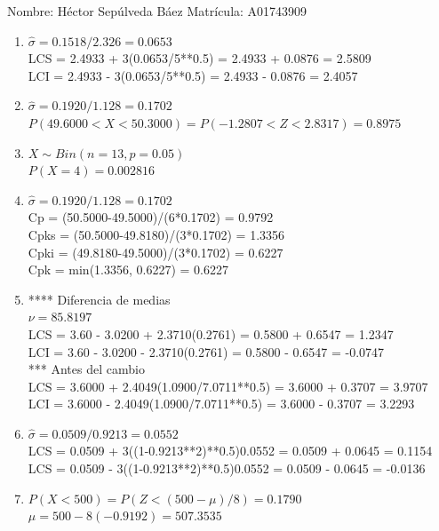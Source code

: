 \documentclass[8pt]{report}
\begin{document}
 \newpage

Nombre: \underline{\hspace*{.2in}}
Héctor Sepúlveda Báez
\underline{\hspace*{.2in}} \quad Matr\'icula:\underline{\hspace*{.2in}}
A01743909
\underline{\hspace*{.2in}} \\

\begin{enumerate}
\item $\hat\sigma = 0.1518/2.326 = 0.0653$\\
LCS = 2.4933 + 3(0.0653/5**0.5) = 2.4933 + 0.0876 = 2.5809\\
LCI = 2.4933 - 3(0.0653/5**0.5) = 2.4933 - 0.0876 = 2.4057
\item $\hat\sigma = 0.1920/1.128 = 0.1702$\\
$P(49.6000 < X < 50.3000) = P(-1.2807 < Z < 2.8317) = 0.8975$\\
\item $X \sim Bin(n=13, p=0.05)$\\
$P(X = 4) = 0.002816$
\item $\hat\sigma = 0.1920/1.128 = 0.1702$\\
Cp = (50.5000-49.5000)/(6*0.1702) = 0.9792\\
Cpks = (50.5000-49.8180)/(3*0.1702) = 1.3356\\
Cpki = (49.8180-49.5000)/(3*0.1702) = 0.6227\\
Cpk = min(1.3356, 0.6227) = 0.6227
\item **** Diferencia de medias\\
$\nu = 85.8197$\\
LCS = 3.60 - 3.0200 + 2.3710(0.2761) = 0.5800 + 0.6547 = 1.2347\\
LCI = 3.60 - 3.0200 - 2.3710(0.2761) = 0.5800 - 0.6547 = -0.0747\\
*** Antes del cambio\\
LCS = 3.6000 + 2.4049(1.0900/7.0711**0.5) = 3.6000 + 0.3707 = 3.9707\\
LCI = 3.6000 - 2.4049(1.0900/7.0711**0.5) = 3.6000 - 0.3707 = 3.2293\\
\item $\hat\sigma = 0.0509/0.9213 = 0.0552$\\
LCS = 0.0509 + 3((1-0.9213**2)**0.5)0.0552 = 0.0509 + 0.0645 = 0.1154\\
LCS = 0.0509 - 3((1-0.9213**2)**0.5)0.0552 = 0.0509 - 0.0645 = -0.0136
\item $P(X < 500) = P(Z < (500-\mu)/8) = 0.1790$\\
$\mu = 500 - 8(-0.9192) = 507.3535$\\
\end{enumerate}
\end{document}
